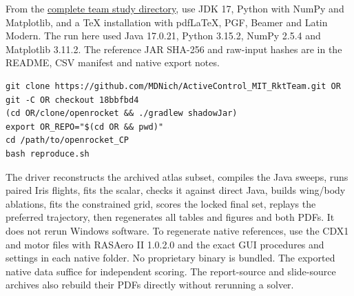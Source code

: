 \documentclass[10pt,letterpaper]{article}
\newcommand{\sub}[1]{\smallskip\noindent{\bfseries\color{navy}#1}\quad}
\begin{document}
\sub{Run order.} From the \href{https://github.com/MDNich/MIT-RT-26_27-Work/tree/main/design_work/openrocket_CP}{complete team study directory}, use JDK 17, Python with NumPy and Matplotlib, and a TeX installation with pdfLaTeX, PGF, Beamer and Latin Modern. The run here used Java 17.0.21, Python 3.15.2, NumPy 2.5.4 and Matplotlib 3.11.2. The reference JAR SHA-256 and raw-input hashes are in the README, CSV manifest and native export notes.
\begin{lstlisting}
git clone https://github.com/MDNich/ActiveControl_MIT_RktTeam.git OR
git -C OR checkout 18bbfbd4
(cd OR/clone/openrocket && ./gradlew shadowJar)
export OR_REPO="$(cd OR && pwd)"
cd /path/to/openrocket_CP
bash reproduce.sh
\end{lstlisting}
The driver reconstructs the archived atlas subset, compiles the Java sweeps, runs paired Iris flights, fits the scalar, checks it against direct Java, builds wing/body ablations, fits the constrained grid, scores the locked final set, replays the preferred trajectory, then regenerates all tables and figures and both PDFs. It does not rerun Windows software. To regenerate native references, use the CDX1 and motor files with RASAero II 1.0.2.0 and the exact GUI procedures and settings in each native folder. No proprietary binary is bundled. The exported native data suffice for independent scoring. The report-source and slide-source archives also rebuild their PDFs directly without rerunning a solver.
\end{document}
